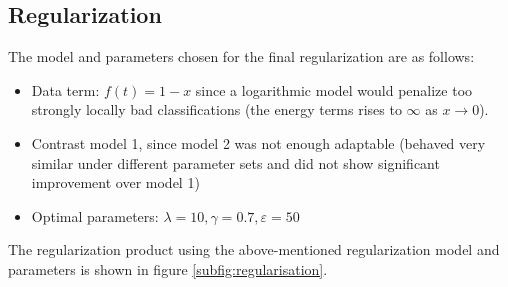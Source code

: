 \documentclass[10pt]{article}
\begin{document}
\subsection{Regularization}

The model and parameters chosen for the final regularization are as follows:
\begin{itemize}
    \item Data term: $f(t)=1-x$ since a logarithmic model would penalize too strongly locally bad classifications (the energy terms rises to $\infty$ as $x\rightarrow 0$).
    \item Contrast model 1, since model 2 was not enough adaptable (behaved very similar under different parameter sets and did not show significant improvement over model 1)
    \item Optimal parameters: $\lambda = 10, \gamma = 0.7, \varepsilon = 50$
\end{itemize}
The regularization product using the above-mentioned regularization model and parameters is shown in figure \ref{subfig:regularisation}.
\end{document}
